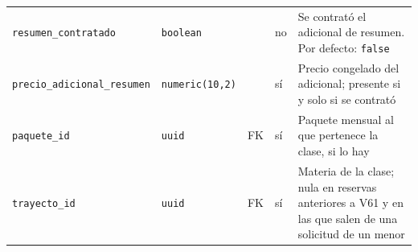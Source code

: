 {\begin{xltabular}{\textwidth}{@{}>{\raggedright\arraybackslash}p{3.6cm} >{\raggedright\arraybackslash}p{2.3cm} >{\raggedright\arraybackslash}p{1cm} >{\centering\arraybackslash}p{0.85cm} L@{}}
    \texttt{resumen\_\allowbreak{}contratado} & \texttt{boolean} &  & no & Se contrató el adicional de resumen. Por defecto: \texttt{false} \\
    \texttt{precio\_\allowbreak{}adicional\_\allowbreak{}resumen} & \texttt{numeric(\allowbreak{}10,\allowbreak{}2)} &  & sí & Precio congelado del adicional; presente si y solo si se contrató \\
    \texttt{paquete\_\allowbreak{}id} & \texttt{uuid} & FK & sí & Paquete mensual al que pertenece la clase, si lo hay \\
    \texttt{trayecto\_\allowbreak{}id} & \texttt{uuid} & FK & sí & Materia de la clase; nula en reservas anteriores a V61 y en las que salen de una solicitud de un menor \\
\end{xltabular}
}

